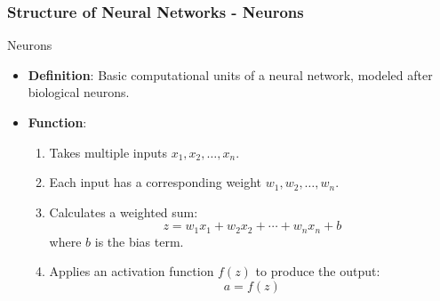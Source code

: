 \documentclass[aspectratio=169]{beamer}
\begin{document}
\begin{frame}[fragile]
    \frametitle{Structure of Neural Networks - Neurons}
    \begin{block}{Neurons}
        \begin{itemize}
            \item \textbf{Definition}: Basic computational units of a neural network, modeled after biological neurons.
            \item \textbf{Function}:
            \begin{enumerate}
                \item Takes multiple inputs \(x_1, x_2, \ldots, x_n\).
                \item Each input has a corresponding weight \(w_1, w_2, \ldots, w_n\).
                \item Calculates a weighted sum:
                \begin{equation}
                    z = w_1x_1 + w_2x_2 + \cdots + w_nx_n + b
                \end{equation}
                where \(b\) is the bias term.
                \item Applies an activation function \(f(z)\) to produce the output:
                \begin{equation}
                    a = f(z)
                \end{equation}
            \end{enumerate}
        \end{itemize}
    \end{block}
\end{frame}
\end{document}
